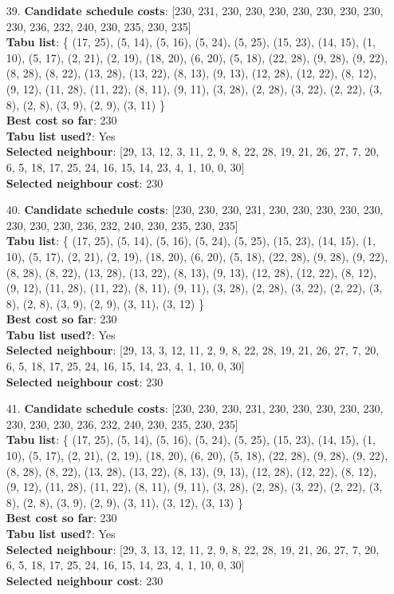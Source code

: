 \documentclass[fleqn]{article}
\begin{document}
\begin{itemize}
    \item[39.] \textbf{Candidate schedule costs}: [230, 231, 230, 230, 230, 230, 230, 230, 230, 230, 236, 232, 240, 230, 235, 230, 235] \\
    \textbf{Tabu list}: \{ (17, 25), (5, 14), (5, 16), (5, 24), (5, 25), (15, 23), (14, 15), (1, 10), (5, 17), (2, 21), (2, 19), (18, 20), (6, 20), (5, 18), (22, 28), (9, 28), (9, 22), (8, 28), (8, 22), (13, 28), (13, 22), (8, 13), (9, 13), (12, 28), (12, 22), (8, 12), (9, 12), (11, 28), (11, 22), (8, 11), (9, 11), (3, 28), (2, 28), (3, 22), (2, 22), (3, 8), (2, 8), (3, 9), (2, 9), (3, 11) \} \\
    \textbf{Best cost so far}: 230 \\
    \textbf{Tabu list used?}: Yes \\
    \textbf{Selected neighbour}: [29, 13, 12, 3, 11, 2, 9, 8, 22, 28, 19, 21, 26, 27, 7, 20, 6, 5, 18, 17, 25, 24, 16, 15, 14, 23, 4, 1, 10, 0, 30] \\
    \textbf{Selected neighbour cost}: 230
      

    \item[40.] \textbf{Candidate schedule costs}: [230, 230, 230, 231, 230, 230, 230, 230, 230, 230, 230, 230, 236, 232, 240, 230, 235, 230, 235] \\
    \textbf{Tabu list}: \{ (17, 25), (5, 14), (5, 16), (5, 24), (5, 25), (15, 23), (14, 15), (1, 10), (5, 17), (2, 21), (2, 19), (18, 20), (6, 20), (5, 18), (22, 28), (9, 28), (9, 22), (8, 28), (8, 22), (13, 28), (13, 22), (8, 13), (9, 13), (12, 28), (12, 22), (8, 12), (9, 12), (11, 28), (11, 22), (8, 11), (9, 11), (3, 28), (2, 28), (3, 22), (2, 22), (3, 8), (2, 8), (3, 9), (2, 9), (3, 11), (3, 12) \} \\
    \textbf{Best cost so far}: 230 \\
    \textbf{Tabu list used?}: Yes \\
    \textbf{Selected neighbour}: [29, 13, 3, 12, 11, 2, 9, 8, 22, 28, 19, 21, 26, 27, 7, 20, 6, 5, 18, 17, 25, 24, 16, 15, 14, 23, 4, 1, 10, 0, 30] \\
    \textbf{Selected neighbour cost}: 230
      

    \item[41.] \textbf{Candidate schedule costs}: [230, 230, 230, 231, 230, 230, 230, 230, 230, 230, 230, 230, 236, 232, 240, 230, 235, 230, 235] \\
    \textbf{Tabu list}: \{ (17, 25), (5, 14), (5, 16), (5, 24), (5, 25), (15, 23), (14, 15), (1, 10), (5, 17), (2, 21), (2, 19), (18, 20), (6, 20), (5, 18), (22, 28), (9, 28), (9, 22), (8, 28), (8, 22), (13, 28), (13, 22), (8, 13), (9, 13), (12, 28), (12, 22), (8, 12), (9, 12), (11, 28), (11, 22), (8, 11), (9, 11), (3, 28), (2, 28), (3, 22), (2, 22), (3, 8), (2, 8), (3, 9), (2, 9), (3, 11), (3, 12), (3, 13) \} \\
    \textbf{Best cost so far}: 230 \\
    \textbf{Tabu list used?}: Yes \\
    \textbf{Selected neighbour}: [29, 3, 13, 12, 11, 2, 9, 8, 22, 28, 19, 21, 26, 27, 7, 20, 6, 5, 18, 17, 25, 24, 16, 15, 14, 23, 4, 1, 10, 0, 30] \\
    \textbf{Selected neighbour cost}: 230
      


\end{itemize}
\end{document}
